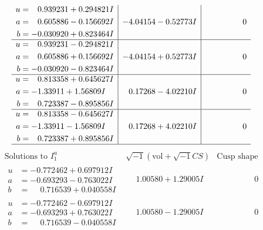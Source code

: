 \documentclass[1p]{elsarticle_modified}
\theoremstyle{definition}
\newcommand{\I}{\sqrt{-1}}
\begin{document}
$$\begin{array}{c|c|c}
\begin{aligned}
u &= \phantom{-}0.939231 + 0.294821 I \\
a &= \phantom{-}0.605886 - 0.156692 I \\
b &= -0.030920 + 0.823464 I\end{aligned}
 & -4.04154 - 0.52773 I & \phantom{-0.000000 } 0 \\ \hline\begin{aligned}
u &= \phantom{-}0.939231 - 0.294821 I \\
a &= \phantom{-}0.605886 + 0.156692 I \\
b &= -0.030920 - 0.823464 I\end{aligned}
 & -4.04154 + 0.52773 I & \phantom{-0.000000 } 0 \\ \hline\begin{aligned}
u &= \phantom{-}0.813358 + 0.645627 I \\
a &= -1.33911 + 1.56809 I \\
b &= \phantom{-}0.723387 - 0.895856 I\end{aligned}
 & \phantom{-}0.17268 - 4.02210 I & \phantom{-0.000000 } 0 \\ \hline\begin{aligned}
u &= \phantom{-}0.813358 - 0.645627 I \\
a &= -1.33911 - 1.56809 I \\
b &= \phantom{-}0.723387 + 0.895856 I\end{aligned}
 & \phantom{-}0.17268 + 4.02210 I & \phantom{-0.000000 } 0\\
 \hline 
 \end{array}$$\newpage$$\begin{array}{c|c|c}  
\text{Solutions to }I^u_{1}& \I (\text{vol} + \sqrt{-1}CS) & \text{Cusp shape}\\
 \hline 
\begin{aligned}
u &= -0.772462 + 0.697912 I \\
a &= -0.693293 - 0.763022 I \\
b &= \phantom{-}0.716539 + 0.040558 I\end{aligned}
 & \phantom{-}1.00580 + 1.29005 I & \phantom{-0.000000 } 0 \\ \hline\begin{aligned}
u &= -0.772462 - 0.697912 I \\
a &= -0.693293 + 0.763022 I \\
b &= \phantom{-}0.716539 - 0.040558 I\end{aligned}
 & \phantom{-}1.00580 - 1.29005 I & \phantom{-0.000000 } 0 \\ \hline\begin{aligned}

\end{aligned}
\end{array}$$
\end{document}
